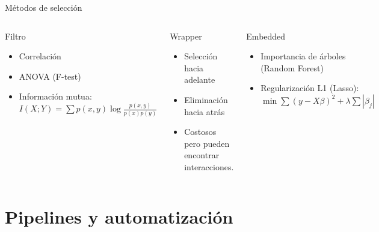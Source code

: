 \documentclass[aspectratio=169, 10pt, xcolor=table]{beamer}
\begin{document}
\begin{frame}{Métodos de selección}
    \begin{columns}[t]
        \begin{block}{Filtro}
            \begin{itemize}
                \item Correlación
                \item ANOVA (F-test)
                \item Información mutua: $I(X;Y)=\sum p(x,y)\log\frac{p(x,y)}{p(x)p(y)}$
            \end{itemize}
        \end{block}
        \begin{block}{Wrapper}
            \begin{itemize}
                \item Selección hacia adelante
                \item Eliminación hacia atrás
                \item Costosos pero pueden encontrar interacciones.
            \end{itemize}
        \end{block}
        \begin{block}{Embedded}
            \begin{itemize}
                \item Importancia de árboles (Random Forest)
                \item Regularización L1 (Lasso): $\min \sum (y-X\beta)^2 + \lambda\sum|\beta_j|$
            \end{itemize}
        \end{block}
    \end{columns}
\end{frame}

\section{Pipelines y automatización}
\end{document}
